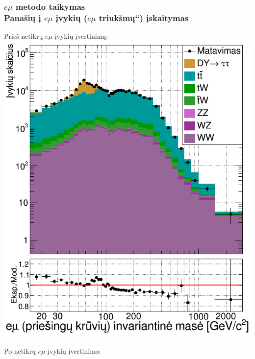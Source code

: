\documentclass[xcolor=dvipsnames]{beamer}
\newcommand{\ltq}[1]{{\quotedblbase{}#1\textquotedblleft{}}}
\newcommand{\emu}{\mathit{e}\mu}
\begin{document}
\begin{frame}
	\frametitle{$\emu$ metodo taikymas\\ \normalsize Panašių į $\emu$ įvykių (\ltq{$\emu$ triukšmų}) įskaitymas}
	\begin{minipage}{0.46\textwidth}
		Prieš netikrų $\emu$ įvykių įvertinimą:
		\includegraphics[width=\linewidth]{emuMassOS_SMALL.png}
	\end{minipage}
	\hfill
	\begin{minipage}{0.46\textwidth}
		Po netikrų $\emu$ įvykių įvertinimo:

\end{minipage}
\end{frame}
\end{document}
